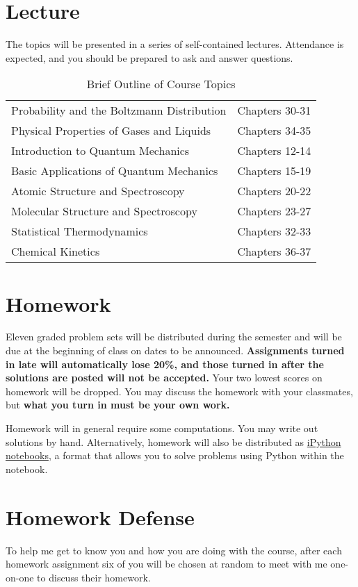 \documentclass[11pt]{article}
\begin{document}
\section{Lecture}
\label{sec:orgf8c71b9}
The topics will be presented in a series of self-contained
lectures. Attendance is expected, and you should be prepared to ask
and answer questions.  

\begin{table}[htbp]
\caption{Brief Outline of Course Topics}
\centering
\begin{tabular}{ll}
\hline
Probability and the Boltzmann Distribution & Chapters 30-31\\
Physical Properties of Gases and Liquids & Chapters 34-35\\
Introduction to Quantum Mechanics & Chapters 12-14\\
Basic Applications of Quantum Mechanics & Chapters 15-19\\
Atomic Structure and Spectroscopy & Chapters 20-22\\
Molecular Structure and Spectroscopy & Chapters 23-27\\
Statistical Thermodynamics & Chapters 32-33\\
Chemical Kinetics & Chapters 36-37\\
\hline
\end{tabular}
\end{table}

\section{Homework}
\label{sec:orgf725cdc}
Eleven graded problem sets will be distributed during the semester and will be due at the beginning of class on dates to be announced.  \textbf{Assignments turned in late will automatically lose 20\%, and those turned in after the solutions are posted will not be accepted.}  Your two lowest scores on homework will be dropped.  You may discuss the homework with your classmates, but \textbf{what you turn in must be your own work.}

Homework will in general require some computations. You may write out solutions by hand. Alternatively, homework will also be distributed as \href{https://ipython.org/notebook.html}{iPython notebooks}, a format that allows you to solve problems using Python within the notebook.
\section{Homework Defense}
\label{sec:org080853e}
To help me get to know you and how you are doing with the course, after each homework assignment six of you will be chosen at random to meet with me one-on-one to discuss their homework.
\end{document}
